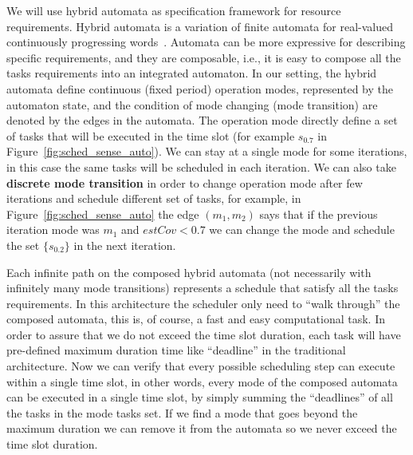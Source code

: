\documentclass[11pt]{article}
\begin{document}
We will use hybrid automata as specification framework for resource requirements.
Hybrid automata is a variation of finite automata for real-valued continuously progressing words~\cite{hibrid-systems}.
Automata can be more expressive for describing specific requirements, and they are composable, i.e., it is easy to compose all the tasks requirements into an integrated automaton.
In our setting, the hybrid automata define continuous (fixed period) operation modes, represented by the automaton state, and the condition of mode changing (mode transition) are denoted by the edges in the automata.
The operation mode directly define a set of tasks that will be executed in the time slot (for example $s_{0.7}$ in Figure~\ref{fig:sched_sense_auto}).
We can stay at a single mode for some iterations, in this case the same tasks will be scheduled in each iteration. 
We can also take \textbf{discrete mode transition} in order to change operation mode after few iterations and schedule different set of tasks, for example, in Figure~\ref{fig:sched_sense_auto} the edge $(m_1,m_2)$ says that if the previous iteration mode was $m_1$ and $estCov < 0.7$ we can change the mode and schedule the set $\{s_{0.2}\}$ in the next iteration.

Each infinite path on the composed hybrid automata (not necessarily with infinitely many mode transitions) represents a schedule that satisfy all the tasks requirements. 
In this architecture the scheduler only need to ``walk through'' the composed automata, this is, of course, a fast and easy computational task. 
In order to assure that we do not exceed the time slot duration, each task will have pre-defined maximum duration time like ``deadline'' in the traditional architecture. Now we can verify that every possible scheduling step can execute within a single time slot, in other words, every mode of the composed automata can be executed in a single time slot, by simply summing the ``deadlines'' of all the tasks in the mode tasks set.
If we find a mode that goes beyond the maximum duration we can remove it from the automata so we never exceed the time slot duration.
\end{document}
